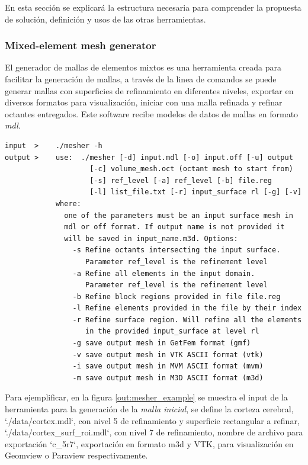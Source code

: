 En esta sección se explicará la estructura necesaria para comprender la propuesta de solución, definición y usos de las otras herramientas.

\subsubsection{Mixed-element mesh generator} \label{section:mesh_generator_definition}

El generador de mallas de elementos mixtos \cite{lobos2015mixed} es una herramienta creada para facilitar la generación de mallas, a través de la linea de comandos se puede generar mallas con superficies de refinamiento en diferentes niveles, exportar en diversos formatos para visualización, iniciar con una malla refinada y refinar octantes entregados.
Este software recibe modelos de datos de mallas en formato \textit{mdl}.

\begin{lstlisting}[style=Console,caption={Opciones de mesher generator.\\ Fuente: Elaboración propia.}]
input  >    ./mesher -h
output >    use:  ./mesher [-d] input.mdl [-o] input.off [-u] output
                    [-c] volume_mesh.oct (octant mesh to start from)
                    [-s] ref_level [-a] ref_level [-b] file.reg 
                    [-l] list_file.txt [-r] input_surface rl [-g] [-v]
            where:
              one of the parameters must be an input surface mesh in
              mdl or off format. If output name is not provided it
              will be saved in input_name.m3d. Options:
                -s Refine octants intersecting the input surface.
                   Parameter ref_level is the refinement level
                -a Refine all elements in the input domain.
                   Parameter ref_level is the refinement level
                -b Refine block regions provided in file file.reg
                -l Refine elements provided in the file by their index
                -r Refine surface region. Will refine all the elements
                   in the provided input_surface at level rl
                -g save output mesh in GetFem format (gmf)
                -v save output mesh in VTK ASCII format (vtk)
                -i save output mesh in MVM ASCII format (mvm)
                -m save output mesh in M3D ASCII format (m3d)
\end{lstlisting}

Para ejemplificar, en la figura \autoref{out:mesher_example} se muestra el input de la herramienta para la generación de la \textit{malla inicial}, se define la corteza cerebral, `./data/cortex.mdl`, con nivel 5 de refinamiento y superficie rectangular a refinar, `./data/cortex\_surf\_roi.mdl`, con nivel 7 de refinamiento, nombre de archivo para exportación `c\_5r7`, exportación en formato m3d y VTK, para visualización en Geomview o Paraview respectivamente.

